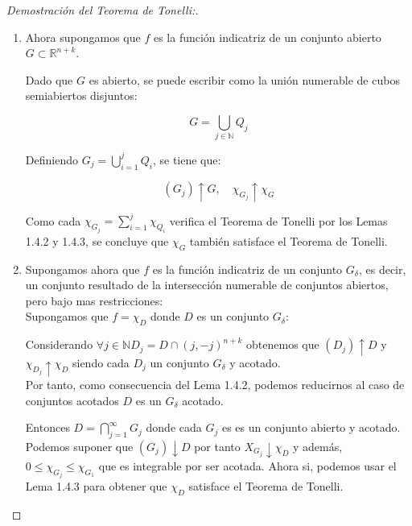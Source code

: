 \begin{proof}[Demostración del Teorema de Tonelli:]
\begin{enumerate}
\item Ahora supongamos que \( f \) es la función indicatriz de un conjunto abierto \(
G \subset \mathbb{R}^{n+k} \).

Dado que \( G \) es abierto, se puede escribir como la unión numerable de cubos
semiabiertos disjuntos:

$$
    G = \bigcup_{j \in \mathbb{N}} Q_j
$$

Definiendo \( G_j = \bigcup_{i=1}^{j} Q_i \), se tiene que:

$$
    (G_j) \uparrow G, \quad \chi_{G_j} \uparrow \chi_G
$$

Como cada \( \chi_{G_j} = \sum_{i=1}^{j} \chi_{Q_i} \) verifica el Teorema de
Tonelli por los Lemas 1.4.2 y 1.4.3, se concluye que \( \chi_G \) también
satisface el Teorema de Tonelli.
\item Supongamos ahora que $f$ es la función indicatriz de un conjunto $G_{\delta}$,
es decir, un conjunto resultado de la intersección numerable de conjuntos
abiertos, pero bajo mas restricciones: \\ Supongamos que $f = \chi_D$ donde $D$
es un conjunto $G_{\delta}$:
\begin{observación}
Considerando $\forall j \in \mathbb{N} D_j = D \cap (j, -j)^{n+k}$ obtenemos que $(D_j)\uparrow D$ y $\chi_{D_j}\uparrow \chi_D$ siendo cada $D_j$ un conjunto $G_{\delta}$ y acotado. \\ Por tanto, como consecuencia del Lema 1.4.2, podemos reducirnos al caso de conjuntos acotados $D$ es un $G_{\delta}$ acotado.
\end{observación}
Entonces $D = \bigcap_{j = 1}^{\infty}G_j$ donde cada $G_j$ es es un conjunto abierto y acotado. Podemos suponer que $(G_j) \downarrow D$ por tanto $X_{G_j} \downarrow \chi_{D}$ y además, $0 \leq \chi_{G_j} \leq \chi_{G_{1}}$ que es integrable por ser acotada. Ahora si, podemos usar el Lema 1.4.3 para obtener que $\chi_{D}$ satisface el Teorema de Tonelli.


\end{enumerate}
\end{proof}
